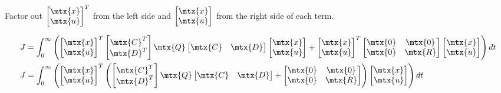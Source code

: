 Factor out $\begin{bmatrix}\mtx{x} \\ \mtx{u}\end{bmatrix}^T$ from the left side
and $\begin{bmatrix}\mtx{x} \\ \mtx{u}\end{bmatrix}$ from the right side of each
term.

\begin{align*}
  J &= \int_0^\infty \left(
    \begin{bmatrix}
      \mtx{x} \\
      \mtx{u}
    \end{bmatrix}^T
    \begin{bmatrix}
      \mtx{C}^T \\
      \mtx{D}^T
    \end{bmatrix}
    \mtx{Q}
    \begin{bmatrix}
      \mtx{C} &
      \mtx{D}
    \end{bmatrix}
    \begin{bmatrix}
      \mtx{x} \\
      \mtx{u}
    \end{bmatrix} +
    \begin{bmatrix}
      \mtx{x} \\
      \mtx{u}
    \end{bmatrix}^T
    \begin{bmatrix}
      \mtx{0} & \mtx{0} \\
      \mtx{0} & \mtx{R}
    \end{bmatrix}
    \begin{bmatrix}
      \mtx{x} \\
      \mtx{u}
    \end{bmatrix}
    \right) dt \\
  J &= \int_0^\infty \left(
    \begin{bmatrix}
      \mtx{x} \\
      \mtx{u}
    \end{bmatrix}^T
    \left(
    \begin{bmatrix}
      \mtx{C}^T \\
      \mtx{D}^T
    \end{bmatrix}
    \mtx{Q}
    \begin{bmatrix}
      \mtx{C} &
      \mtx{D}
    \end{bmatrix} +
    \begin{bmatrix}
      \mtx{0} & \mtx{0} \\
      \mtx{0} & \mtx{R}
    \end{bmatrix}
    \right)
    \begin{bmatrix}
      \mtx{x} \\
      \mtx{u}
    \end{bmatrix}
    \right) dt
\end{align*}

